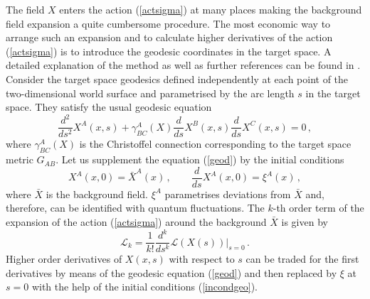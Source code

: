The field $X$ enters the action (\ref{actsigma}) at many places making
the background field expansion a quite cumbersome procedure. The most
economic way to arrange such an expansion and to calculate higher
derivatives of the action (\ref{actsigma}) is to introduce the geodesic
coordinates in the target space. A detailed explanation of the method 
as well as further references can be found in \cite{Braaten:1985is}.
Consider the target space geodesics defined
independently at each point of the two-dimensional world surface
and parametrised by the arc length $s$ in the target space. They satisfy
the usual geodesic equation
\begin{equation}
\frac{d^2}{ds^2} X^A(x,s) +{\gamma}_{BC}^A(X)
\frac{d}{ds} X^B(x,s) \frac{d}{ds} X^C(x,s)=0 \,,
\label{geod}
\end{equation}
where ${\gamma}_{BC}^A(X)$ is the Christoffel connection
corresponding to the target space metric $G_{AB}$.
Let us supplement the equation (\ref{geod}) by the initial
conditions
\begin{equation}
X^A(x,0)=\bar X^A(x)\,, \qquad \frac{d}{ds} X^A(x,0)=
\xi^A(x)\,, \label{incondgeo}
\end{equation}
where $\bar X$ is the background field. $\xi^A$ parametrises
deviations from $\bar X$ and, therefore, can be identified with
quantum fluctuations. The
$k$-th order term of the expansion of the action
(\ref{actsigma}) around the background $\bar X$ is given by
\begin{equation}
\mathcal{L}_k=\frac 1{k!} \frac{d^k}{ds^k} \mathcal{L}(X(s)) \vert_{s=0} \,.
\label{Snsig}
\end{equation}
Higher order derivatives of $X(x,s)$ with respect to $s$
can be traded for the first derivatives by means of the
geodesic equation (\ref{geod}) and then replaced by $\xi$
at $s=0$ with the help of the initial conditions (\ref{incondgeo}).

